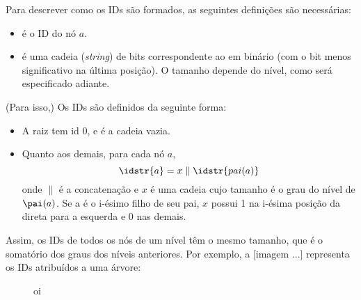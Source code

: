 Para descrever como os IDs são formados, as seguintes definições são necessárias:
\begin{itemize}
	\item {} é o ID do nó $a$.
	\item {} é uma cadeia ({\it string}) de bits correspondente ao  em binário (com o bit menos significativo na última posição). O tamanho depende do nível, como será especificado adiante.
\end{itemize}
(Para isso,) Os IDs são definidos da seguinte forma:
\begin{itemize}
	\item A raiz tem id 0, e  é a cadeia vazia.
	\item Quanto aos demais, para cada nó $a$,
		$$\idstr{a} = x \parallel \idstr{pai(a)}$$
	onde $\parallel$ é a concatenação e $x$ é uma cadeia cujo tamanho é o grau do nível de $\pai(a)$.
	Se a é o i-ésimo filho de seu pai, $x$ possui 1 na i-ésima posição da direta para a esquerda e 0 nas demais.
\end{itemize}

Assim, os IDs de todos os nós de um nível têm o mesmo tamanho, que é o somatório dos graus dos níveis anteriores.
Por exemplo, a [imagem ...] representa os IDs atribuídos a uma árvore:

\begin{figure} \caption{oi} \label{img:exemplo_ids}
\end{figure}
